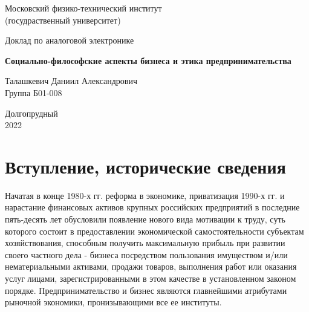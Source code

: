 \documentclass[a4paper, 12pt]{article}%
\begin{document}


\begin{titlepage}

	\newpage
	\begin{center}
		\normalsize Московский физико-технический институт \\(госудраственный 			университет)
	\end{center}

	\vspace{6em}

	\begin{center}
		\Large Доклад по аналоговой электронике\\
	\end{center}

	\vspace{1em}

	\begin{center}
		\large \textbf{Социально-философские аспекты бизнеса и этика предпринимательства}
	\end{center}

	\vspace{2em}

	\begin{center}
		\large Талашкевич Даниил Александрович\\
		Группа Б01-008
	\end{center}

	\vspace{\fill}

	\begin{center}
	Долгопрудный \\2022
	\end{center}
	
\end{titlepage}



	\thispagestyle{empty}
	\newpage
	\tableofcontents
	\newpage
	\setcounter{page}{1}



\section{Вступление, исторические сведения}

Начатая в конце 1980-х гг. реформа в экономике, приватизация 1990-х гг. и нарастание финансовых активов крупных российских предприятий в последние пять-десять лет обусловили появление нового вида мотивации к труду, суть которого состоит в предоставлении экономической самостоятельности субъектам хозяйствования, способным получить максимальную прибыль при развитии своего частного дела - бизнеса посредством пользования имуществом и/или нематериальными активами, продажи товаров, выполнения работ или оказания услуг лицами, зарегистрированными в этом качестве в установленном законом порядке. Предпринимательство и бизнес являются главнейшими атрибутами рыночной экономики, пронизывающими все ее институты.
\end{document}
